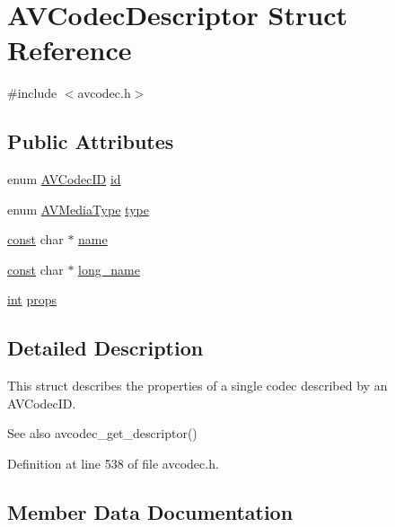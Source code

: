 \hypertarget{struct_a_v_codec_descriptor}{}\section{A\+V\+Codec\+Descriptor Struct Reference}
\label{struct_a_v_codec_descriptor}


{\ttfamily \#include $<$avcodec.\+h$>$}

\subsection*{Public Attributes}
\begin{DoxyCompactItemize}
\item 
enum \hyperlink{group__lavc__core_gaadca229ad2c20e060a14fec08a5cc7ce}{A\+V\+Codec\+ID} \hyperlink{struct_a_v_codec_descriptor_ab7ba57d70e9d4d50bba20c778c09d069}{id}
\item 
enum \hyperlink{group__lavu__misc_ga9a84bba4713dfced21a1a56163be1f48}{A\+V\+Media\+Type} \hyperlink{struct_a_v_codec_descriptor_ad628ddb3416cafa38c9d4f3c1f61ad50}{type}
\item 
\hyperlink{getopt1_8c_a2c212835823e3c54a8ab6d95c652660e}{const} char $\ast$ \hyperlink{struct_a_v_codec_descriptor_a955dba1de947abbed22d28682b0db516}{name}
\item 
\hyperlink{getopt1_8c_a2c212835823e3c54a8ab6d95c652660e}{const} char $\ast$ \hyperlink{struct_a_v_codec_descriptor_a31fa9d4fed68cfe8a128d461ec2d3e20}{long\+\_\+name}
\item 
\hyperlink{xmltok_8h_a5a0d4a5641ce434f1d23533f2b2e6653}{int} \hyperlink{struct_a_v_codec_descriptor_a9949288403a12812cd6e3892ac45f40f}{props}
\end{DoxyCompactItemize}


\subsection{Detailed Description}
This struct describes the properties of a single codec described by an A\+V\+Codec\+ID. \begin{DoxySeeAlso}{See also}
avcodec\+\_\+get\+\_\+descriptor() 
\end{DoxySeeAlso}


Definition at line 538 of file avcodec.\+h.



\subsection{Member Data Documentation}
